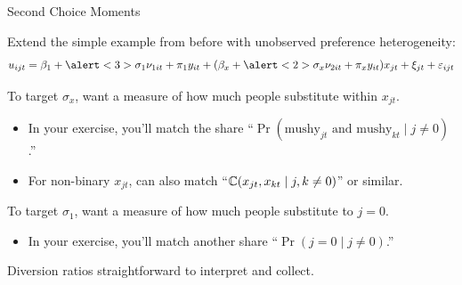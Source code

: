 \documentclass[aspectratio=169,t,11pt,table]{beamer}
\begin{document}
\begin{frame}{Second Choice Moments}
    \begin{wideitemize}
        \item Extend the simple example from before with unobserved preference heterogeneity:
        \begin{equation*}
            u_{ijt} = \beta_1 + \alert<3>{\sigma_1} \nu_{1it} + \pi_1 y_{it} + (\beta_x + \alert<2>{\sigma_x} \nu_{2it} + \pi_x y_{it}) x_{jt} + \xi_{jt} + \varepsilon_{ijt} 
        \end{equation*}
        \vspace{-1.5\baselineskip}
        \pause
        \item To target \alert<2>{$\sigma_x$}, want a measure of how much people substitute within $x_{jt}$.
        \begin{itemize}
            \item In your exercise, you'll match the share ``$\Pr(\text{mushy}_{jt} \text{ and } \text{mushy}_{kt} \mid j \neq 0)$.''
            \item For non-binary $x_{jt}$, can also match ``$\mathbb{C}(x_{jt}, x_{kt} \mid j, k \neq 0)$'' or similar.
        \end{itemize}
        \pause
        \item To target \alert<3>{$\sigma_1$}, want a measure of how much people substitute to $j = 0$.
        \begin{itemize}
            \item In your exercise, you'll match another share ``$\Pr(j = 0 \mid j \neq 0)$.''
        \end{itemize}
        \pause
        \item \alert{Diversion ratios} straightforward to interpret and collect.
    \end{wideitemize}
\end{frame}
\end{document}
